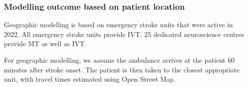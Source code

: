 \subsubsection{Modelling outcome based on patient location}

Geographic modelling is based on emergency stroke units that were active in 2022. All emergency stroke units provide IVT. 25 dedicated neuroscience centres provide MT as well as IVT.

For geographic modelling, we assume the ambulance arrives at the patient 60 minutes after stroke onset. The patient is then taken to the closest appropriate unit, with travel times estimated using Open Street Map.

